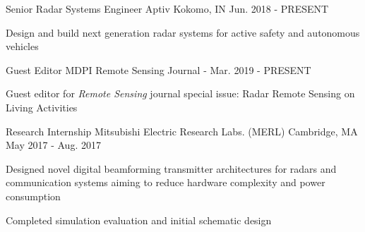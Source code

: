 
\begin{cventries}

  \cventry
    {Senior Radar Systems Engineer}
    {Aptiv}
    {Kokomo, IN}
    {Jun. 2018 - PRESENT}
    {
      \begin{cvitems}
        \item {Design and build next generation radar systems for active safety and autonomous vehicles}
      \end{cvitems}
    }
    
  \cventry
    {Guest Editor}
    {MDPI Remote Sensing Journal}
    {-}
    {Mar. 2019 - PRESENT}
    {
      \begin{cvitems}
        \item {Guest editor for {\em{Remote Sensing}} journal special issue: Radar Remote Sensing on Living Activities}
      \end{cvitems}
    }

  \cventry
    {Research Internship}
    {Mitsubishi Electric Research Labs. (MERL)}
    {Cambridge, MA}
    {May 2017 - Aug. 2017}
    {
      \begin{cvitems}
        \item {Designed novel digital beamforming transmitter architectures for radars and communication systems aiming to reduce hardware complexity and power consumption}
        \item {Completed simulation evaluation and initial schematic design}
      \end{cvitems}
    }

\end{cventries}
